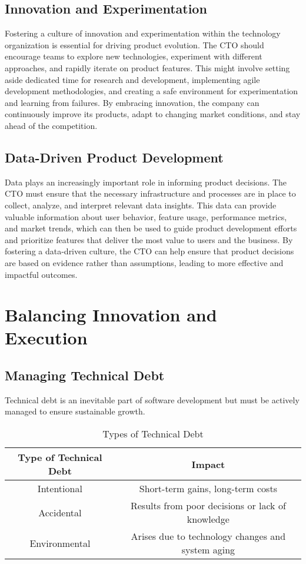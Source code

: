 \subsection{Innovation and Experimentation}
Fostering a culture of innovation and experimentation within the technology organization is essential for driving product evolution. The \gls{CTO} should encourage teams to explore new technologies, experiment with different approaches, and rapidly iterate on product features. This might involve setting aside dedicated time for research and development, implementing agile development methodologies, and creating a safe environment for experimentation and learning from failures. By embracing innovation, the company can continuously improve its products, adapt to changing market conditions, and stay ahead of the competition.

\subsection{Data-Driven Product Development}
Data plays an increasingly important role in informing product decisions. The \gls{CTO} must ensure that the necessary infrastructure and processes are in place to collect, analyze, and interpret relevant data insights. This data can provide valuable information about user behavior, feature usage, performance metrics, and market trends, which can then be used to guide product development efforts and prioritize features that deliver the most value to users and the business. By fostering a data-driven culture, the \gls{CTO} can help ensure that product decisions are based on evidence rather than assumptions, leading to more effective and impactful outcomes.


\section{Balancing Innovation and Execution}

\subsection{Managing Technical Debt}
Technical debt is an inevitable part of software development but must be actively managed to ensure sustainable growth.

\begin{table}[h]
    \centering
    \begin{tabular}{|c|c|}
        \hline
        \textbf{Type of Technical Debt} & \textbf{Impact}                                   \\
        \hline
        Intentional                     & Short-term gains, long-term costs                 \\
        \hline
        Accidental                      & Results from poor decisions or lack of knowledge  \\
        \hline
        Environmental                   & Arises due to technology changes and system aging \\
        \hline
    \end{tabular}
    \caption{Types of Technical Debt}
\end{table}

